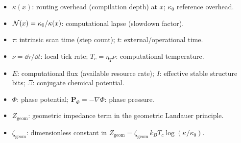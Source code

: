 \begin{itemize}
  \item $\kappa(x)$: routing overhead (compilation depth) at $x$; $\kappa_0$ reference overhead.
  \item $\mathcal{N}(x)=\kappa_0/\kappa(x)$: computational lapse (slowdown factor).
  \item $\tau$: intrinsic scan time (step count); $t$: external/operational time.
  \item $\nu=\dd\tau/\dd t$: local tick rate; $T_c=\eta_T\nu$: computational temperature.
  \item $E$: computational flux (available resource rate); $I$: effective stable structure bits; $\Xi$: conjugate chemical potential.
  \item $\Phi$: phase potential; $\mathbf{P}_\Phi=-\nabla\Phi$: phase pressure.
  \item $Z_{\mathrm{geom}}$: geometric impedance term in the geometric Landauer principle.
  \item $\zeta_{\mathrm{geom}}$: dimensionless constant in $Z_{\mathrm{geom}}=\zeta_{\mathrm{geom}}\,k_B T_c\log(\kappa/\kappa_0)$.
\end{itemize}


